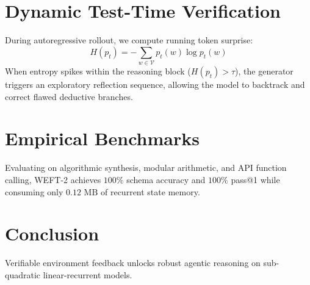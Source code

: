 \documentclass[11pt,a4paper]{article}
\begin{document}
\section{Dynamic Test-Time Verification}
During autoregressive rollout, we compute running token surprise:
\begin{equation}
H(p_t) = -\sum_{w \in \mathcal{V}} p_t(w) \log p_t(w)
\end{equation}
When entropy spikes within the reasoning block ($H(p_t) > \tau$), the generator triggers an exploratory reflection sequence, allowing the model to backtrack and correct flawed deductive branches.

\section{Empirical Benchmarks}
Evaluating on algorithmic synthesis, modular arithmetic, and API function calling, WEFT-2 achieves $100\%$ schema accuracy and $100\%$ pass@1 while consuming only $0.12\text{ MB}$ of recurrent state memory.

\section{Conclusion}
Verifiable environment feedback unlocks robust agentic reasoning on sub-quadratic linear-recurrent models.
\end{document}
